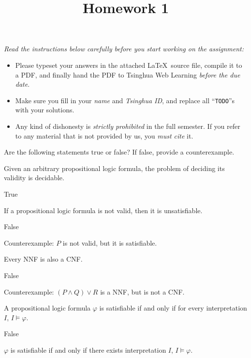 \documentclass[11pt,a4paper]{article}
\title{Homework 1}
\begin{document}
\maketitle

\textit{Read the instructions below carefully before you start working on the assignment:}
\begin{itemize}
    \item Please typeset your answers in the attached \LaTeX~source file, compile it to a PDF,
    and finally hand the PDF to Tsinghua Web Learning \emph{before the due date}.
    \item Make sure you fill in your \emph{name} and \emph{Tsinghua ID},
    and replace all ``\texttt{TODO}''s with your solutions.
    \item Any kind of dishonesty is \emph{strictly prohibited} in the full semester.
    If you refer to any material that is not provided by us, you \emph{must cite} it.
\end{itemize}



Are the following statements true or false? If false, provide a counterexample.

\subproblem Given an arbitrary propositional logic formula, the problem of deciding its validity is decidable.

\begin{solution}
    True
\end{solution}

\subproblem If a propositional logic formula is not valid, then it is unsatisfiable.

\begin{solution}
    False
    
    Counterexample: $P$ is not valid, but it is satisfiable.
\end{solution}

\subproblem Every NNF is also a CNF.

\begin{solution}
    False
    
    Counterexample: $(P \land Q) \lor R$ is a NNF, but is not a CNF.
\end{solution}

\subproblem A propositional logic formula $\varphi$ is satisfiable if and only if for every interpretation $I$,
$I \models \varphi$.

\begin{solution}
    False
    
    $\varphi$ is satisfiable if and only if there exists interpretation $I$,
    $I \models \varphi$.
\end{solution}
\end{document}
